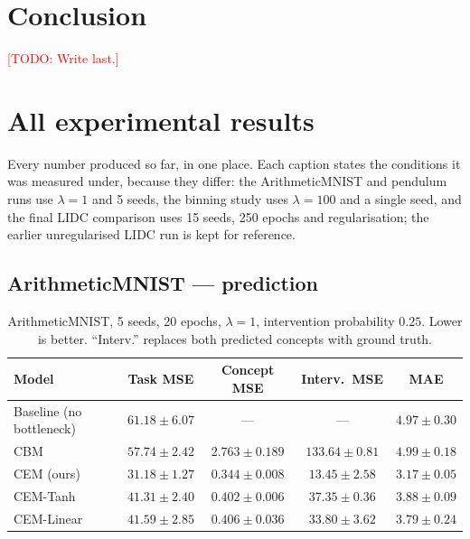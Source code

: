 \documentclass[11pt]{article}
\newcommand{\todo}[1]{\textcolor{red}{[TODO: #1]}}
\begin{document}
\section{Conclusion}
\todo{Write last.}


\appendix
\section{All experimental results}
\label{app:tables}

Every number produced so far, in one place. Each caption states the conditions
it was measured under, because they differ: the ArithmeticMNIST and pendulum
runs use $\lambda = 1$ and 5 seeds, the binning study uses $\lambda = 100$ and
a single seed, and the final LIDC comparison uses 15 seeds, 250 epochs and
regularisation; the earlier unregularised LIDC run is kept for reference.

\subsection{ArithmeticMNIST --- prediction}

\begin{table}[h]
\centering
\caption{ArithmeticMNIST, 5 seeds, 20 epochs, $\lambda = 1$, intervention
probability $0.25$. Lower is better. ``Interv.'' replaces both predicted
concepts with ground truth.}
\label{tab:app-mnist}
\begin{tabular}{lcccc}
\toprule
\textbf{Model} & \textbf{Task MSE} & \textbf{Concept MSE} &
\textbf{Interv.\ MSE} & \textbf{MAE} \\
\midrule
Baseline (no bottleneck) & $61.18 \pm 6.07$ & --- & --- & $4.97 \pm 0.30$ \\
CBM                      & $57.74 \pm 2.42$ & $2.763 \pm 0.189$ & $133.64 \pm 0.81$ & $4.99 \pm 0.18$ \\
CEM (ours)               & $\mathbf{31.18 \pm 1.27}$ & $\mathbf{0.344 \pm 0.008}$ & $\mathbf{13.45 \pm 2.58}$ & $\mathbf{3.17 \pm 0.05}$ \\
CEM-Tanh                 & $41.31 \pm 2.40$ & $0.402 \pm 0.006$ & $37.35 \pm 0.36$ & $3.88 \pm 0.09$ \\
CEM-Linear               & $41.59 \pm 2.85$ & $0.406 \pm 0.036$ & $33.80 \pm 3.62$ & $3.79 \pm 0.24$ \\
\bottomrule
\end{tabular}
\end{table}
\end{document}
